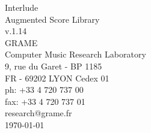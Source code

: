 \documentclass[a4paper]{book}
\begin{document}
\begin{titlepage}
\vspace*{7cm}
\begin{center}
{\huge Interlude\\ Augmented Score Library \\[1ex]\large v.1.14}\\
\vspace*{2cm}
{\large GRAME \\ Computer Music Research Laboratory}\\
\vspace*{0.5cm}
{\small 9, rue du Garet - BP 1185}\\
{\small FR - 69202 LYON Cedex 01}\\
\vspace*{0.5cm}
{\small ph:  +33 4 720 737 00}\\
{\small fax: +33 4 720 737 01}\\
\vspace*{0.5cm}
{\small research@grame.fr}\\
\vspace*{0.5cm}
\today 
\end{center}
\end{titlepage}
\clearemptydoublepage
{}
\tableofcontents
\clearemptydoublepage
{}
\end{document}

